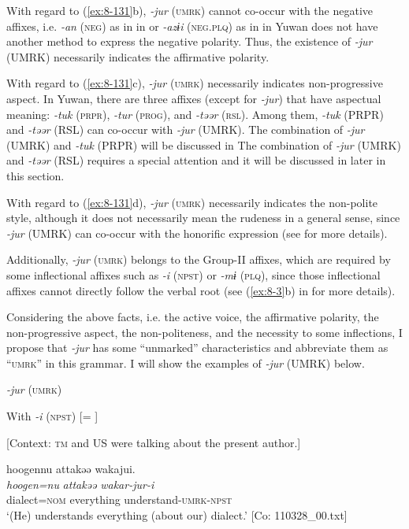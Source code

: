 With regard to (\ref{ex:8-131}b), \textit{-jur} (\textsc{umrk}) cannot co-occur with the negative affixes, i.e. \textit{-an} (\textsc{neg}) as in  in  or \textit{-azɨi} (\textsc{neg}.\textsc{plq}) as in  in  Yuwan does not have another method to express the negative polarity. Thus, the existence of \textit{-jur} (UMRK) necessarily indicates the affirmative polarity.

  With regard to (\ref{ex:8-131}c), \textit{-jur} (\textsc{umrk}) necessarily indicates non-progressive aspect. In Yuwan, there are three affixes (except for \textit{-jur}) that have aspectual meaning: \textit{-tuk} (\textsc{prpr}), \textit{-tur} (\textsc{prog}), and \textit{-təər} (\textsc{rsl}). Among them, \textit{-tuk} (PRPR) and \textit{-təər} (RSL) can co-occur with \textit{-jur} (UMRK). The combination of \textit{-jur} (UMRK) and \textit{-tuk} (PRPR) will be discussed in  The combination of \textit{-jur} (UMRK) and \textit{-təər} (RSL) requires a special attention and it will be discussed in later in this section.

With regard to (\ref{ex:8-131}d), \textit{-jur} (\textsc{umrk}) necessarily indicates the non-polite style, although it does not necessarily mean the rudeness in a general sense, since \textit{-jur} (UMRK) can co-occur with the honorific expression (see  for more details).

Additionally, \textit{-jur} (\textsc{umrk}) belongs to the Group-II affixes, which are required by some inflectional affixes such as \textit{-i} (\textsc{npst}) or \textit{-mɨ} (\textsc{plq}), since those inflectional affixes cannot directly follow the verbal root (see (\ref{ex:8-3}b) in  for more details).

  Considering the above facts, i.e. the active voice, the affirmative polarity, the non-progressive aspect, the non-politeness, and the necessity to some inflections, I propose that \textit{-jur} has some “unmarked” characteristics and abbreviate them as “\textsc{umrk}” in this grammar. I will show the examples of \textit{-jur} (UMRK) below.

\ea\label{ex:8-132}
  \textit{-jur} (\textsc{umrk})

\ea With \textit{-i} (\textsc{npst}) [= ]

  [Context: \textsc{tm} and US were talking about the present author.]

  {\TM}
\glll  {\textbar}hoogen{\textbar}nu  attakəə  wakajui.\\
\textit{hoogen=nu}  \textit{attakəə}  \textit{wakar-jur-i}\\
    dialect=\textsc{nom}  everything  understand-\textsc{umrk}-\textsc{npst}\\
\glt ‘(He) understands everything (about our) dialect.’ [Co: 110328\_00.txt]


